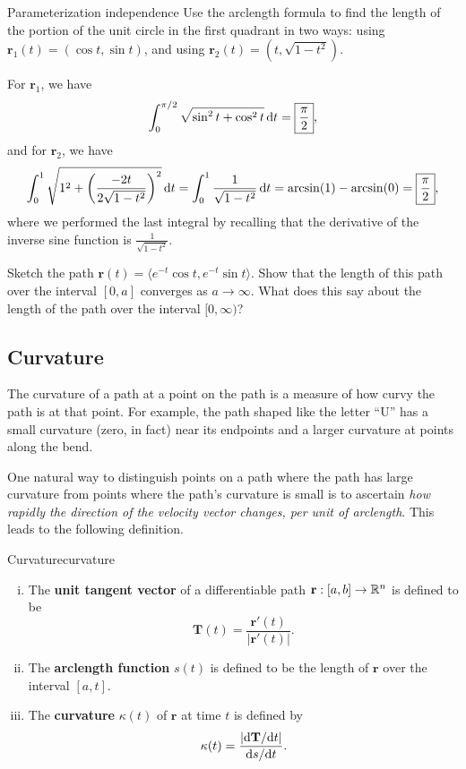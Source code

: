\documentclass{watsonbook}
\begin{document}
\begin{example}{Parameterization independence}{}
  Use the arclength formula to find the length of the portion of the
  unit circle in the first quadrant in two ways: using $\mathbf{r}_1(t)
  = (\cos t, \sin t)$, and using $\mathbf{r}_2(t) = (t,\sqrt{1-t^2})$. 
\end{example}

\begin{solution}
  For $\mathbf{r}_1$, we have 
  \[
    \int_0^{\pi/2} \sqrt{\sin^2 t + \cos^2 t} \, \mathrm{d} t = \boxed{\frac{\pi}{2}}, 
  \]
  and for $\mathbf{r}_2$, we have
  \[
    \int_0^1 \sqrt{1^2 + \left(\frac{-2t}{2\sqrt{1-t^2}}\right)^2}\, \mathrm{d}
    t =  \int_0^1 \frac{1}{\sqrt{1-t^2}} \, \mathrm{d} t = \arcsin(1) -
    \arcsin(0) = \boxed{\frac{\pi}{2}}, 
  \]
  where we performed the last integral by recalling that the
  derivative of the inverse sine function is
  $\frac{1}{\sqrt{1-t^2}}$. 
\end{solution}

\begin{exercise}{}{}
  Sketch the path
  $\mathbf{r}(t) = \langle e^{-t} \cos t, e^{-t} \sin t \rangle$. Show
  that the length of this path over the interval $[0,a]$ converges as
  $a\to\infty$. What does this say about the length of the path over
  the interval $[0,\infty)$?
\end{exercise}

\subsection{Curvature} 

The curvature of a path at a point on the path is a measure of how
curvy the path is at that point. For example, the path shaped like the
letter ``\textsf{U}'' has a small curvature (zero, in fact) near its
endpoints and a larger curvature at points along the bend.

One natural way to distinguish points on a path where the path has
large curvature from points where the path's curvature is small is to
ascertain \textit{how rapidly the direction of the velocity vector
  changes, per unit of arclength}. This leads to the following
definition.

\begin{defn}[breakable]{Curvature}{curvature}
  \begin{enumerate}[(i),leftmargin=12pt,topsep=-6pt,itemsep=4pt]
    \item The \textbf{unit tangent vector} of a differentiable path $\mathbf{r}:[a,b]
  \to \mathbb{R}^n$ is defined to be
  \[
    \mathbf{T}(t) = \frac{\mathbf{r}'(t)}{|\mathbf{r}'(t)|}. 
  \]
  \item The \textbf{arclength function} $s(t)$ is defined to be the length
  of $\mathbf{r}$ over the interval $[a,t]$.
  \item The \textbf{curvature} $\kappa(t)$ of $\mathbf{r}$ at time $t$ is
  defined by
  \[
    \mathbf{\kappa}(t) = \frac{|\mathrm{d}\mathbf{T}/\mathrm{d} t|}{\mathrm{d} s/\mathrm{d} t}. 
  \]
\end{enumerate}
\end{defn}
\end{document}
